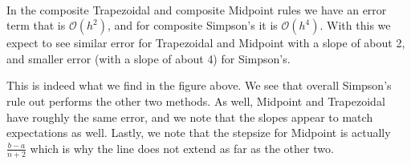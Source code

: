 \documentclass[11pt]{article}
\begin{document}
    \begin{center}
    \end{center}
    { \hspace*{\fill} \\}
    
    In the composite Trapezoidal and composite Midpoint rules we have an
error term that is \(\mathcal{O}(h^2)\), and for composite Simpson's it
is \(\mathcal{O}(h^4)\). With this we expect to see similar error for
Trapezoidal and Midpoint with a slope of about 2, and smaller error
(with a slope of about 4) for Simpson's.

This is indeed what we find in the figure above. We see that overall
Simpson's rule out performs the other two methods. As well, Midpoint and
Trapezoidal have roughly the same error, and we note that the slopes
appear to match expectations as well. Lastly, we note that the stepsize
for Midpoint is actually \(\frac{b-a}{n+2}\) which is why the line does
not extend as far as the other two.


    
    
    
\end{document}
